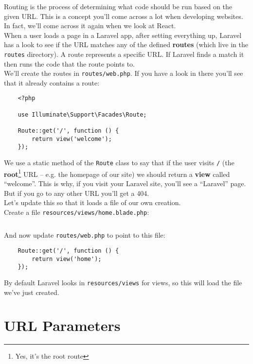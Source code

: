 Routing is the process of determining what code should be run based on the given URL. This is a concept you'll come across a lot when developing websites. In fact, we'll come across it again when we look at React.
\\

When a user loads a page in a Laravel app, after setting everything up, Laravel has a look to see if the URL matches any of the defined \textbf{routes} (which live in the \texttt{routes} directory). A route represents a specific URL. If Laravel finds a match it then runs the code that the route points to.
\\

We'll create the routes in \texttt{routes/web.php}. If you have a look in there you'll see that it already contains a route:

\begin{verbatim}
    <?php

    use Illuminate\Support\Facades\Route;

    Route::get('/', function () {
        return view('welcome');
    });
\end{verbatim}

We use a static method of the \texttt{Route} class to say that if the user visits \texttt{/} (the \textbf{root}\footnote{Yes, it's the root route} URL – e.g. the homepage of our site) we should return a \textbf{view} called ``welcome''. This is why, if you visit your Laravel site, you'll see a ``Laravel'' page. But if you go to any other URL you'll get a 404.
\\

Let's update this so that it loads a file of our own creation.
\\

Create a file \texttt{resources/views/home.blade.php}:

\inputminted{html}{05-routing/figures/01-home.html}

And now update \texttt{routes/web.php} to point to this file:

\begin{verbatim}
    Route::get('/', function () {
        return view('home');
    });
\end{verbatim}

By default Laravel looks in \texttt{resources/views} for views, so this will load the file we've just created.


\section{URL Parameters}

